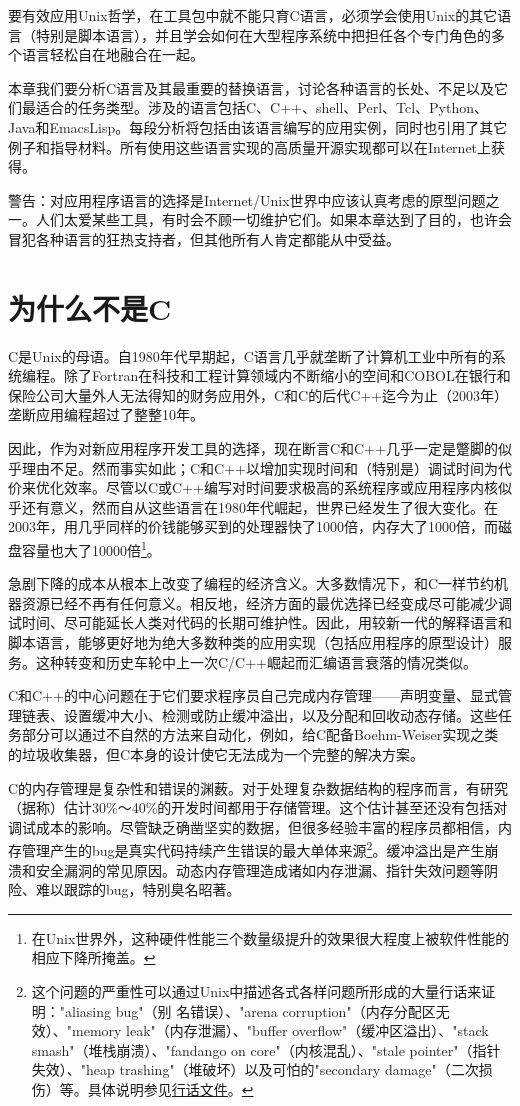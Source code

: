 \documentclass[12pt,oneside]{book}
\begin{document}
要有效应用Unix哲学，在工具包中就不能只育C语言，必须学会使用Unix的其它语言（特别是脚本语言），并且学会如何在大型程序系统中把担任各个专门角色的多个语言轻松自在地融合在一起。

本章我们要分析C语言及其最重要的替换语言，讨论各种语言的长处、不足以及它们最适合的任务类型。涉及的语言包括C、C++、shell、Perl、Tcl、Python、Java和EmacsLisp。每段分析将包括由该语言编写的应用实例，同时也引用了其它例子和指导材料。所有使用这些语言实现的高质量开源实现都可以在Internet上获得。

警告：对应用程序语言的选择是Internet/Unix世界中应该认真考虑的原型问题之一。人们太爱某些工具，有时会不顾一切维护它们。如果本章达到了目的，也许会冒犯各种语言的狂热支持者，但其他所有人肯定都能从中受益。

\section{为什么不是C}
C是Unix的母语。自1980年代早期起，C语言几乎就垄断了计算机工业中所有的系统编程。除了Fortran在科技和工程计算领域内不断缩小的空间和COBOL在银行和保险公司大量外人无法得知的财务应用外，C和C的后代C++迄今为止（2003年）垄断应用编程超过了整整10年。

因此，作为对新应用程序开发工具的选择，现在断言C和C++几乎一定是蹩脚的似乎理由不足。然而事实如此；C和C++以增加实现时间和（特别是）调试时间为代价来优化效率。尽管以C或C++编写对时间要求极高的系统程序或应用程序内核似乎还有意义，然而自从这些语言在1980年代崛起，世界已经发生了很大变化。在2003年，用几乎同样的价钱能够买到的处理器快了1000倍，内存大了1000倍，而磁盘容量也大了10000倍\footnote{在Unix世界外，这种硬件性能三个数量级提升的效果很大程度上被软件性能的相应下降所掩盖。}。

急剧下降的成本从根本上改变了编程的经济含义。大多数情况下，和C一样节约机器资源已经不再有任何意义。相反地，经济方面的最优选择已经变成尽可能减少调试时间、尽可能延长人类对代码的长期可维护性。因此，用较新一代的解释语言和脚本语言，能够更好地为绝大多数种类的应用实现（包括应用程序的原型设计）服务。这种转变和历史车轮中上一次C/C++崛起而汇编语言衰落的情况类似。

C和C++的中心问题在于它们要求程序员自己完成内存管理——声明变量、显式管理链表、设置缓冲大小、检测或防止缓冲溢出，以及分配和回收动态存储。这些任务部分可以通过不自然的方法来自动化，例如，给C配备Boehm-Weiser实现之类的垃圾收集器，但C本身的设计使它无法成为一个完整的解决方案。

C的内存管理是复杂性和错误的渊薮。对于处理复杂数据结构的程序而言，有研究（据\cite{Boehm}称）估计30\%{}～40\%{}的开发时间都用于存储管理。这个估计甚至还没有包括对调试成本的影响。尽管缺乏确凿坚实的数据，但很多经验丰富的程序员都相信，内存管理产生的bug是真实代码持续产生错误的最大单体来源\footnote{这个问题的严重性可以通过Unix中描述各式各样问题所形成的大量行话来证明："aliasing bug"（别      
名错误）、"arena corruption"（内存分配区无效）、"memory leak"（内存泄漏）、"buffer overflow"（缓冲区溢出）、"stack smash"（堆栈崩溃）、"fandango on core"（内核混乱）、"stale pointer"（指针失效）、"heap trashing"（堆破坏）以及可怕的"secondary damage"（二次损伤）等。具体说明参见\href{http://www.catb.org/~esr/jargon}{行话文件}。}。缓冲溢出是产生崩溃和安全漏洞的常见原因。动态内存管理造成诸如内存泄漏、指针失效问题等阴险、难以跟踪的bug，特别臭名昭著。
\end{document}
